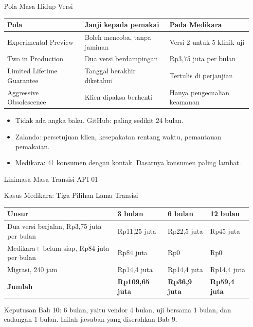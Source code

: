 \documentclass[aspectratio=169, table, 12pt]{beamer}
\begin{document}
\begin{frame}{{\Large Pola Masa Hidup Versi}}
  \footnotesize
  \begin{tabularx}{\textwidth}{>{\raggedright\arraybackslash}p{3.7cm} >{\raggedright\arraybackslash}X >{\raggedright\arraybackslash}p{4.5cm}}
    \hline
    \textbf{Pola} & \textbf{Janji kepada pemakai} & \textbf{Pada Medikara} \\ \hline
    Experimental Preview & Boleh mencoba, tanpa jaminan & Versi 2 untuk 5 klinik uji \\ \hline
    Two in Production & Dua versi berdampingan & Rp3,75 juta per bulan \\ \hline
    Limited Lifetime Guarantee & Tanggal berakhir diketahui & Tertulis di perjanjian \\ \hline
    Aggressive Obsolescence & Klien dipaksa berhenti & Hanya pengecualian keamanan \\ \hline
  \end{tabularx}

  \vspace{8pt}
  \small
  \begin{itemize}
    \item Tidak ada angka baku. GitHub: paling sedikit 24 bulan.
    \item Zalando: persetujuan klien, kesepakatan rentang waktu, pemantauan pemakaian.
    \item Medikara: 41 konsumen dengan kontak. Dasarnya konsumen paling lambat.
  \end{itemize}
\end{frame}

\begin{frame}{{\Large Linimasa Masa Transisi API-01}}
  \centering
\end{frame}

\begin{frame}{{\Large Kasus Medikara: Tiga Pilihan Lama Transisi}}
  \footnotesize
  \begin{tabularx}{\textwidth}{>{\raggedright\arraybackslash}X >{\raggedright\arraybackslash}p{2.5cm} >{\raggedright\arraybackslash}p{2.2cm} >{\raggedright\arraybackslash}p{2.2cm}}
    \hline
    \textbf{Unsur} & \textbf{3 bulan} & \textbf{6 bulan} & \textbf{12 bulan} \\ \hline
    Dua versi berjalan, Rp3,75 juta per bulan & Rp11,25 juta & Rp22,5 juta & Rp45 juta \\ \hline
    Medikara+ belum siap, Rp84 juta per bulan & Rp84 juta & Rp0 & Rp0 \\ \hline
    Migrasi, 240 jam & Rp14,4 juta & Rp14,4 juta & Rp14,4 juta \\ \hline
    \textbf{Jumlah} & \textbf{Rp109,65 juta} & \textbf{Rp36,9 juta} & \textbf{Rp59,4 juta} \\ \hline
  \end{tabularx}

  \vspace{8pt}
  \small Keputusan Bab 10: 6 bulan, yaitu vendor 4 bulan, uji bersama 1 bulan, dan cadangan 1 bulan. Inilah jawaban yang diserahkan Bab 9.
\end{frame}
\end{document}

